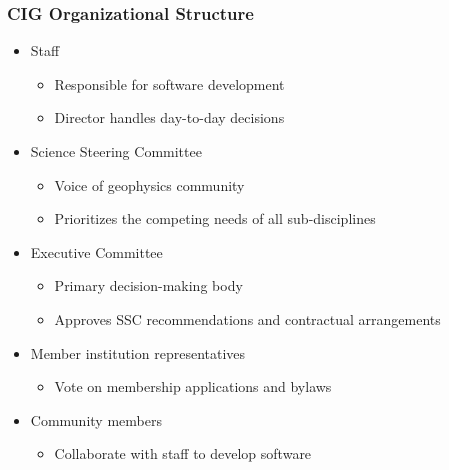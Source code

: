 \documentclass{beamer}
\begin{document}
\begin{frame}
  \frametitle{CIG Organizational Structure}
  \summary{}
 
  \begin{itemize}
  \item Staff
    \begin{itemize}
    \item Responsible for software development
    \item Director handles day-to-day decisions
    \end{itemize}
  \item Science Steering Committee
    \begin{itemize}
    \item Voice of geophysics community
    \item Prioritizes the competing needs of all sub-disciplines
    \end{itemize}
  \item Executive Committee
    \begin{itemize}
    \item Primary decision-making body
    \item Approves SSC recommendations and contractual arrangements
    \end{itemize}
  \item Member institution representatives
    \begin{itemize}
    \item Vote on membership applications and bylaws
    \end{itemize}
  \item Community members
    \begin{itemize}
    \item Collaborate with staff to develop software
    \end{itemize}
  \end{itemize}

\end{frame}
\end{document}

